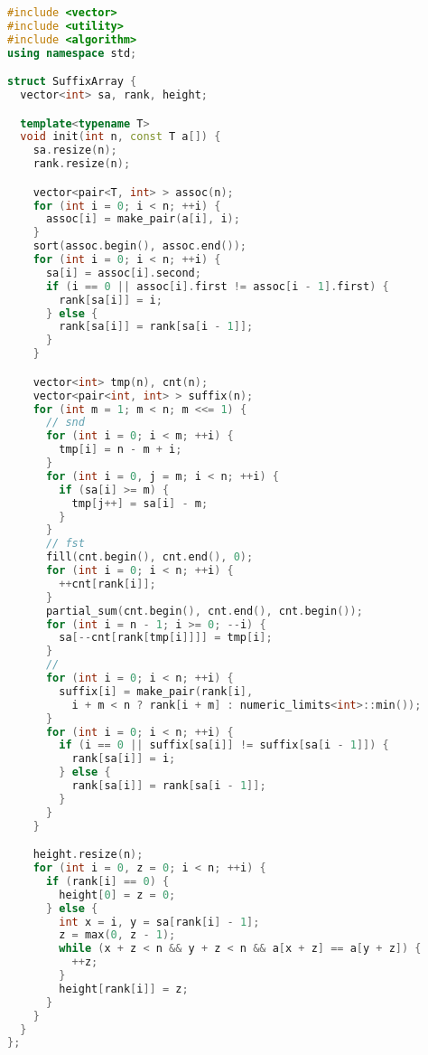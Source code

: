 \begin{lstlisting}[language=C++]
#include <vector>
#include <utility>
#include <algorithm>
using namespace std;

struct SuffixArray {
  vector<int> sa, rank, height;

  template<typename T>
  void init(int n, const T a[]) {
    sa.resize(n);
    rank.resize(n);

    vector<pair<T, int> > assoc(n);
    for (int i = 0; i < n; ++i) {
      assoc[i] = make_pair(a[i], i);
    }
    sort(assoc.begin(), assoc.end());
    for (int i = 0; i < n; ++i) {
      sa[i] = assoc[i].second;
      if (i == 0 || assoc[i].first != assoc[i - 1].first) {
        rank[sa[i]] = i;
      } else {
        rank[sa[i]] = rank[sa[i - 1]];
      }
    }

    vector<int> tmp(n), cnt(n);
    vector<pair<int, int> > suffix(n);
    for (int m = 1; m < n; m <<= 1) {
      // snd
      for (int i = 0; i < m; ++i) {
        tmp[i] = n - m + i;
      }
      for (int i = 0, j = m; i < n; ++i) {
        if (sa[i] >= m) {
          tmp[j++] = sa[i] - m;
        }
      }
      // fst
      fill(cnt.begin(), cnt.end(), 0);
      for (int i = 0; i < n; ++i) {
        ++cnt[rank[i]];
      }
      partial_sum(cnt.begin(), cnt.end(), cnt.begin());
      for (int i = n - 1; i >= 0; --i) {
        sa[--cnt[rank[tmp[i]]]] = tmp[i];
      }
      //
      for (int i = 0; i < n; ++i) {
        suffix[i] = make_pair(rank[i],
          i + m < n ? rank[i + m] : numeric_limits<int>::min());
      }
      for (int i = 0; i < n; ++i) {
        if (i == 0 || suffix[sa[i]] != suffix[sa[i - 1]]) {
          rank[sa[i]] = i;
        } else {
          rank[sa[i]] = rank[sa[i - 1]];
        }
      }
    }

    height.resize(n);
    for (int i = 0, z = 0; i < n; ++i) {
      if (rank[i] == 0) {
        height[0] = z = 0;
      } else {
        int x = i, y = sa[rank[i] - 1];
        z = max(0, z - 1);
        while (x + z < n && y + z < n && a[x + z] == a[y + z]) {
          ++z;
        }
        height[rank[i]] = z;
      }
    }
  }
};

\end{lstlisting}
